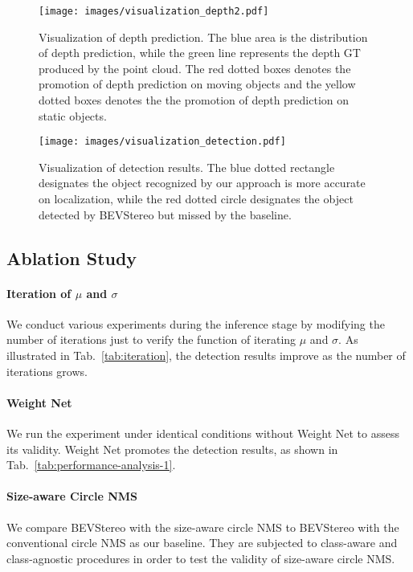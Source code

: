 \documentclass[letterpaper]{article} \usepackage[]{aaai23}  \usepackage{times}  \usepackage{helvet}  \usepackage{courier}  \usepackage[hyphens]{url}  \usepackage{graphicx} \urlstyle{rm} \def\UrlFont{\rm}  \usepackage{natbib}  \usepackage{caption} \frenchspacing  \setlength{\pdfpagewidth}{8.5in} \setlength{\pdfpageheight}{11in} \usepackage{algorithm}
\begin{document}
\begin{figure*}[h!]
\texttt{[image: images/visualization\_depth2.pdf]}
\centering
\caption{Visualization of depth prediction. The blue area is the distribution of depth prediction, while the green line represents the depth GT produced by the point cloud. The red dotted boxes denotes the promotion of depth prediction on moving objects and the yellow dotted boxes denotes the the promotion of depth prediction on static objects.}
\label{fig:visualize_depth}
\end{figure*}






\begin{figure*}[t!]
\texttt{[image: images/visualization\_detection.pdf]}
\centering
\caption{Visualization of detection results. The blue dotted rectangle designates the object recognized by our approach is more accurate on localization, while the red dotted circle designates the object detected by BEVStereo but missed by the baseline.}
\label{fig:visualize_detection}
\end{figure*}



\subsection{Ablation Study}
\paragraph{Iteration of $\mu$ and $\sigma$}
We conduct various experiments during the inference stage by modifying the number of iterations just to verify the function of iterating $\mu$ and $\sigma$. As illustrated in Tab.~\ref{tab:iteration}, the detection results improve as the number of iterations grows.
\paragraph{Weight Net}
We run the experiment under identical conditions without Weight Net to assess its validity. Weight Net promotes the detection results, as shown in Tab.~\ref{tab:performance-analysis-1}. 

\paragraph{Size-aware Circle NMS}
We compare BEVStereo with the size-aware circle NMS to BEVStereo with the conventional circle NMS as our baseline. They are subjected to class-aware and class-agnostic procedures in order to test the validity of size-aware circle NMS.
\end{document}
